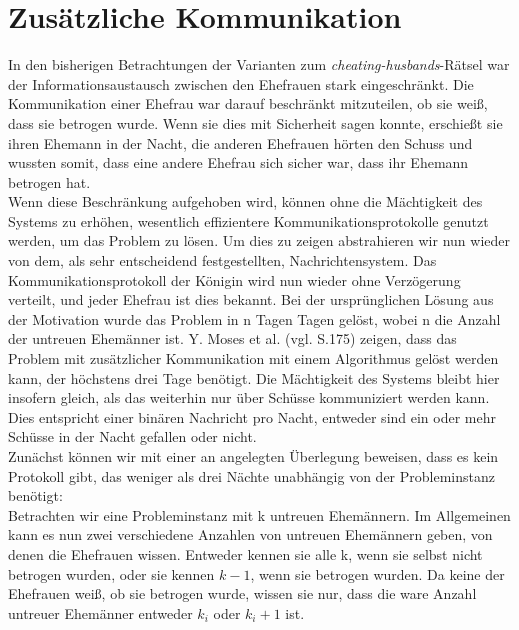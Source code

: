 \section{Zusätzliche Kommunikation}
\label{Kommuniaktion}
In den bisherigen Betrachtungen der Varianten zum \textit{cheating-husbands}-Rätsel war der Informationsaustausch zwischen den Ehefrauen stark eingeschränkt.
Die Kommunikation einer Ehefrau war darauf beschränkt mitzuteilen, ob sie weiß, dass sie betrogen wurde.
Wenn sie dies mit Sicherheit sagen konnte, erschießt sie ihren Ehemann in der Nacht, die anderen Ehefrauen hörten den Schuss und wussten somit, dass eine andere Ehefrau sich sicher war, dass ihr Ehemann betrogen hat.\\
Wenn diese Beschränkung aufgehoben wird, können ohne die Mächtigkeit des Systems zu erhöhen, wesentlich effizientere Kommunikationsprotokolle genutzt werden, um das Problem zu lösen.
Um dies zu zeigen abstrahieren wir nun wieder von dem, als sehr entscheidend festgestellten, Nachrichtensystem. 
Das Kommunikationsprotokoll der Königin wird nun wieder ohne Verzögerung verteilt, und jeder Ehefrau ist dies bekannt.
Bei der ursprünglichen Lösung aus der Motivation wurde das Problem in n Tagen Tagen gelöst, wobei n die Anzahl der untreuen Ehemänner ist.
Y. Moses et al. \cite{moses1986cheating} (vgl. S.175) zeigen, dass das Problem mit zusätzlicher Kommunikation mit einem Algorithmus gelöst werden kann, der höchstens drei Tage benötigt.
Die Mächtigkeit des Systems bleibt hier insofern gleich, als das weiterhin nur über Schüsse kommuniziert werden kann. Dies entspricht einer binären Nachricht pro Nacht, entweder sind ein oder mehr Schüsse in der Nacht gefallen oder nicht.\\
Zunächst können wir mit einer an \cite{moses1986cheating} angelegten Überlegung beweisen, dass es kein Protokoll gibt, das weniger als drei Nächte unabhängig von der Probleminstanz benötigt:\\
Betrachten wir eine Probleminstanz mit k untreuen Ehemännern.
Im Allgemeinen kann es nun zwei verschiedene Anzahlen von untreuen Ehemännern geben, von denen die Ehefrauen wissen.
Entweder kennen sie alle k, wenn sie selbst nicht betrogen wurden, oder sie kennen $k-1$, wenn sie betrogen wurden.
Da keine der Ehefrauen weiß, ob sie betrogen wurde, wissen sie nur, dass die ware Anzahl untreuer Ehemänner entweder $k_i$ oder $k_i+1$ ist.
